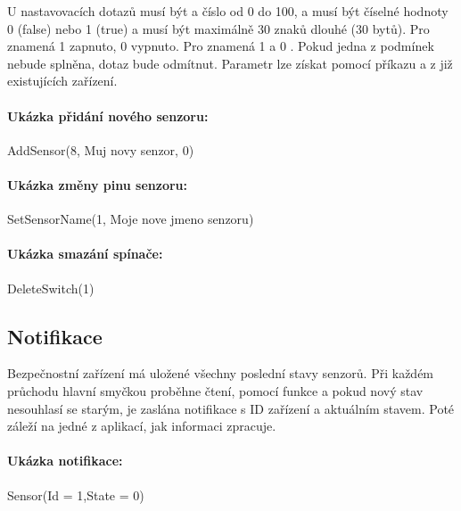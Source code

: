 \documentclass[FM,MP]{tulthesis}  %
\begin{document}
U nastavovacích dotazů musí být  a  číslo od 0 do 100,  a  musí být číselné hodnoty 0 (false) nebo 1 (true) a  musí být maximálně 30 znaků dlouhé (30 bytů). Pro  znamená 1 zapnuto, 0 vypnuto. Pro  znamená 1  a 0 . Pokud jedna z podmínek nebude splněna, dotaz bude odmítnut. Parametr  lze získat pomocí příkazu  a  z již existujících zařízení.

\paragraph{Ukázka přidání nového senzoru:}
\begin{center}
AddSensor(8, Muj novy senzor, 0)
\end{center}

\paragraph{Ukázka změny pinu senzoru:}
\begin{center}
SetSensorName(1, Moje nove jmeno senzoru)
\end{center}

\paragraph{Ukázka smazání spínače:}
\begin{center}
DeleteSwitch(1)
\end{center}

\subsection{Notifikace}
Bezpečnostní zařízení má uložené všechny poslední stavy senzorů. Při každém průchodu hlavní smyčkou proběhne čtení, pomocí funkce  a pokud nový stav nesouhlasí se starým, je zaslána notifikace s ID zařízení a aktuálním stavem. Poté záleží na jedné z aplikací, jak informaci zpracuje.

\paragraph{Ukázka notifikace:}
\begin{center}
Sensor(Id = 1,State = 0)
\end{center} 
\end{document}
